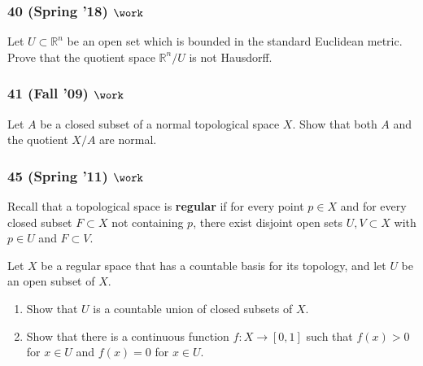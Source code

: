 \hypertarget{spring-18-work}{%
\subsubsection{\texorpdfstring{40 (Spring '18)
\(\work\)}{40 (Spring '18) \textbackslash work}}\label{spring-18-work}}

\begin{problem}[?]

Let \(U \subset {\mathbb{R}}^n\) be an open set which is bounded in the
standard Euclidean metric. Prove that the quotient space
\({\mathbb{R}}^n / U\) is not Hausdorff.

\end{problem}

\hypertarget{fall-09-work}{%
\subsubsection{\texorpdfstring{41 (Fall '09)
\(\work\)}{41 (Fall '09) \textbackslash work}}\label{fall-09-work}}

\begin{problem}[?]

Let \(A\) be a closed subset of a normal topological space \(X\). Show
that both \(A\) and the quotient \(X/A\) are normal.

\end{problem}

\hypertarget{spring-11-work-1}{%
\subsubsection{\texorpdfstring{45 (Spring '11)
\(\work\)}{45 (Spring '11) \textbackslash work}}\label{spring-11-work-1}}

\begin{problem}[?]

Recall that a topological space is \textbf{regular} if for every point
\(p \in X\) and for every closed subset \(F \subset X\) not containing
\(p\), there exist disjoint open sets \(U, V \subset X\) with
\(p \in U\) and \(F \subset V\).

Let \(X\) be a regular space that has a countable basis for its
topology, and let \(U\) be an open subset of \(X\).

\begin{enumerate}
\def\labelenumi{\alph{enumi}.}
\item
  Show that \(U\) is a countable union of closed subsets of \(X\).
\item
  Show that there is a continuous function \(f : X \to [0,1]\) such that
  \(f (x) > 0\) for \(x \in U\) and \(f (x) = 0\) for \(x \in U\).
\end{enumerate}

\end{problem}

